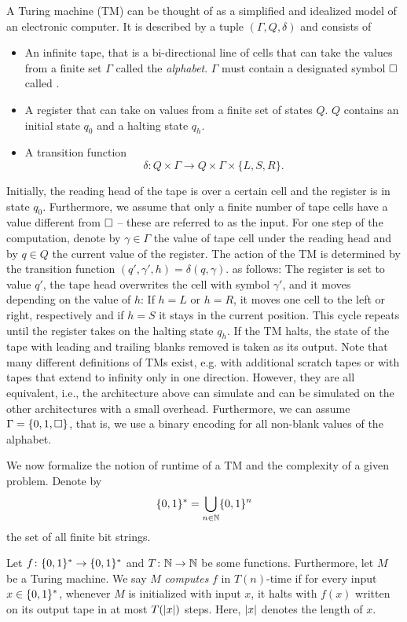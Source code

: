 
A Turing machine (TM) can be thought of as a simplified and idealized model of an electronic computer.
It is described by a tuple $(\Gamma, Q, \delta)$ and consists of
\begin{itemize}
  \item An infinite tape, that is a bi-directional line of cells that can take the values from a finite set $\Gamma$ called the \emph{alphabet}.
    $\Gamma$ must contain a designated symbol $\square$ called .
  \item A register that can take on values from a finite set of states $Q$.
    $Q$ contains an initial state $q_0$ and a halting state $q_h$.
  \item A transition function
    \[
      \delta\colon Q \times \Gamma \to Q \times \Gamma \times \{L, S, R\}.
    \]
\end{itemize}
Initially, the reading head of the tape is over a certain cell and the register is in state $q_0$.
Furthermore, we assume that only a finite number of tape cells have a value different from $\square$ -- these are referred to as the input.
For one step of the computation, denote by $\gamma \in \Gamma$ the value of tape cell under the reading head and by $q \in Q$ the current value of the register.
The action of the TM is determined by the transition function
\(
  (q', \gamma', h) = \delta(q, \gamma).
\)
as follows:
The register is set to value $q'$, the tape head overwrites the cell with symbol $\gamma'$, and it moves depending on the value of $h$:
If $h = L$ or $h = R$, it moves one cell to the left or right, respectively and if $h = S$ it stays in the current position.
This cycle repeats until the register takes on the halting state $q_h$.
If the TM halts, the state of the tape with leading and trailing blanks removed is taken as its output.
Note that many different definitions of TMs exist, e.g. with additional scratch tapes or with tapes that extend to infinity only in one direction.
However, they are all equivalent, i.e., the architecture above can simulate and can be simulated on the other architectures with a small overhead.
Furthermore, we can assume $\Gamma = \{0, 1, \square\}$, that is, we use a binary encoding for all non-blank values of the alphabet.

We now formalize the notion of runtime of a TM and the complexity of a given problem.
Denote by
\[
  \{0, 1\}^* = \bigcup_{n \in \mathbb{N}} \{0, 1\}^n
\]
the set of all finite bit strings.

\begin{definition}{\cite[Def.\ 1.3]{Arora_2009_Computational}}
  \label{def:complexity.runtime}
  Let $f\colon \{0, 1\}^* \to \{0, 1\}^*$ and $T\colon \mathbb{N} \to \mathbb{N}$ be some functions.
  Furthermore, let $M$ be a Turing machine.
  We say $M$ \emph{computes} $f$ in $T(n)$-time if for every input $x \in \{0, 1\}^*$, whenever $M$ is initialized with input $x$, it halts with $f(x)$ written on its output tape in at most $T({\vert x\vert})$ steps.
  Here, ${\vert x\vert}$ denotes the length of $x$.
\end{definition}

